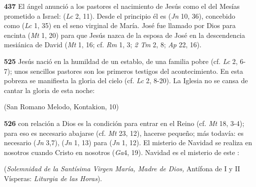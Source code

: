 \begin{body}
\begin{body}
\textbf{437} El ángel anunció a los pastores el nacimiento de Jesús como el del Mesías prometido a Israel:  (\emph{Lc} 2, 11). Desde el principio él es  (\emph{Jn} 10, 36), concebido como  (\emph{Lc} 1, 35) en el seno virginal de María. José fue llamado por Dios para  encinta  (\emph{Mt} 1, 20) para que Jesús  nazca de la esposa de José en la descendencia mesiánica de David (\emph{Mt} 1, 16; cf. \emph{Rm} 1, 3; \emph{2 Tm} 2, 8; \emph{Ap} 22, 16).

\textbf{525} Jesús nació en la humildad de un establo, de una familia pobre (cf. \emph{Lc} 2, 6-7); unos sencillos pastores son los primeros testigos del acontecimiento. En esta pobreza se manifiesta la gloria del cielo (cf. \emph{Lc} 2, 8-20). La Iglesia no se cansa de cantar la gloria de esta noche:


(San Romano Melodo, Kontakion, 10)

\textbf{526}  con relación a Dios es la condición para entrar en el Reino (cf. \emph{Mt} 18, 3-4); para eso es necesario abajarse (cf. \emph{Mt} 23, 12), hacerse pequeño; más todavía: es necesario  (\emph{Jn} 3,7),  (\emph{Jn} 1, 13) para  (\emph{Jn} 1, 12). El misterio de Navidad se realiza en nosotros cuando Cristo  en nosotros (\emph{Ga}4, 19). Navidad es el misterio de este :

 (\emph{Solemnidad de la Santísima Virgen María, Madre de Dios,} Antífona de I y II Vísperas: \emph{Liturgia de las Horas}).


\end{body}
\end{body}
